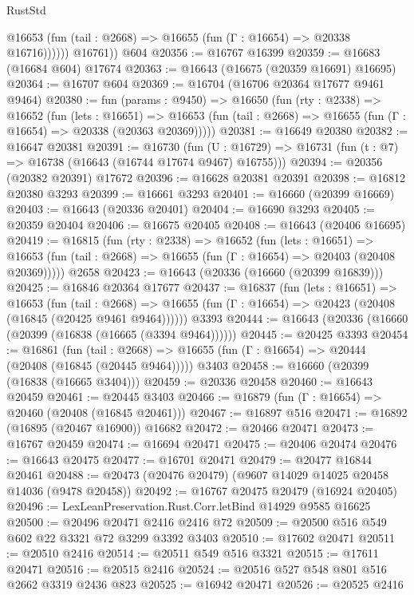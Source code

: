 \begin{lexlean}{RustStd}
\begin{coremodule}
              @16653 (fun (tail : @2668) => @16655 (fun (Γ : @16654) => @20338 @16716))))))
        @16761))
    @604
@20356 := @16767 @16399
@20359 := @16683 (@16684 @604) @17674
@20363 := @16643 (@16675 (@20359 @16691) @16695)
@20364 := @16707 @604
@20369 := @16704 (@16706 @20364 @17677 @9461 @9464)
@20380 := fun (params : @9450) =>
  @16650
    (fun (rty : @2338) =>
    @16652
      (fun (lets : @16651) =>
      @16653 (fun (tail : @2668) => @16655 (fun (Γ : @16654) => @20338 (@20363 @20369)))))
@20381 := @16649 @20380
@20382 := @16647 @20381
@20391 := @16730
    (fun (U : @16729) => @16731 (fun (t : @7) => @16738 (@16643 (@16744 @17674 @9467) @16755)))
@20394 := @20356 (@20382 @20391) @17672
@20396 := @16628 @20381 @20391
@20398 := @16812 @20380 @3293
@20399 := @16661 @3293
@20401 := @16660 (@20399 @16669)
@20403 := @16643 (@20336 @20401)
@20404 := @16690 @3293
@20405 := @20359 @20404
@20406 := @16675 @20405
@20408 := @16643 (@20406 @16695)
@20419 := @16815
    (fun (rty : @2338) =>
    @16652
      (fun (lets : @16651) =>
      @16653 (fun (tail : @2668) => @16655 (fun (Γ : @16654) => @20403 (@20408 @20369)))))
    @2658
@20423 := @16643 (@20336 (@16660 (@20399 @16839)))
@20425 := @16846 @20364 @17677
@20437 := @16837
    (fun (lets : @16651) =>
    @16653
      (fun (tail : @2668) =>
      @16655 (fun (Γ : @16654) => @20423 (@20408 (@16845 (@20425 @9461 @9464))))))
    @3393
@20444 := @16643 (@20336 (@16660 (@20399 (@16838 (@16665 (@3394 @9464))))))
@20445 := @20425 @3393
@20454 := @16861
    (fun (tail : @2668) => @16655 (fun (Γ : @16654) => @20444 (@20408 (@16845 (@20445 @9464)))))
    @3403
@20458 := @16660 (@20399 (@16838 (@16665 @3404)))
@20459 := @20336 @20458
@20460 := @16643 @20459
@20461 := @20445 @3403
@20466 := @16879 (fun (Γ : @16654) => @20460 (@20408 (@16845 @20461)))
@20467 := @16897 @516
@20471 := @16892 (@16895 (@20467 @16900)) @16682
@20472 := @20466 @20471
@20473 := @16767 @20459
@20474 := @16694 @20471
@20475 := @20406 @20474
@20476 := @16643 @20475
@20477 := @16701 @20471
@20479 := @20477 @16844 @20461
@20488 := @20473 (@20476 @20479) (@9607 @14029 @14025 @20458 @14036 (@9478 @20458))
@20492 := @16767 @20475 @20479 (@16924 @20405)
@20496 := LexLeanPreservation.Rust.Corr.letBind @14929 @9585 @16625
@20500 := @20496 @20471 @2416 @2416 @72
@20509 := @20500 @516 @549 @602 @22 @3321 @72 @3299 @3392 @3403
@20510 := @17602 @20471
@20511 := @20510 @2416
@20514 := @20511 @549 @516 @3321
@20515 := @17611 @20471
@20516 := @20515 @2416
@20524 := @20516 @527 @548 @801 @516 @2662 @3319 @2436 @823
@20525 := @16942 @20471
@20526 := @20525 @2416

\end{coremodule}
\end{lexlean}
